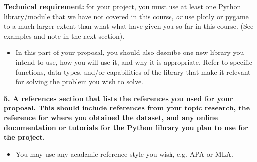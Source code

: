 \documentclass[fontsize=11pt]{article}
\begin{document}
\textbf{Technical requirement:} for your project, you must use at least one Python library/module that we have not covered in this course, \emph{or} use \underline{plotly} or \underline{pygame} to a much larger extent than what what have given you so far in this course. (See examples and note in the next section).

\begin{itemize}
    \item In this part of your proposal, you should also describe one new library you intend to use, how you will use it, and why it is appropriate. Refer to specific functions, data types, and/or capabilities of the library that make it relevant for solving the problem you wish to solve.
\end{itemize}

\textbf{\large 5. A references section that lists the references you used for your proposal. This should include references from your topic research, the reference for where you obtained the dataset, and any online documentation or tutorials for the Python library you plan to use for the project.}

\begin{itemize}
    \item You may use any academic reference style you wish, e.g. APA or MLA.
\end{itemize}
\end{document}
